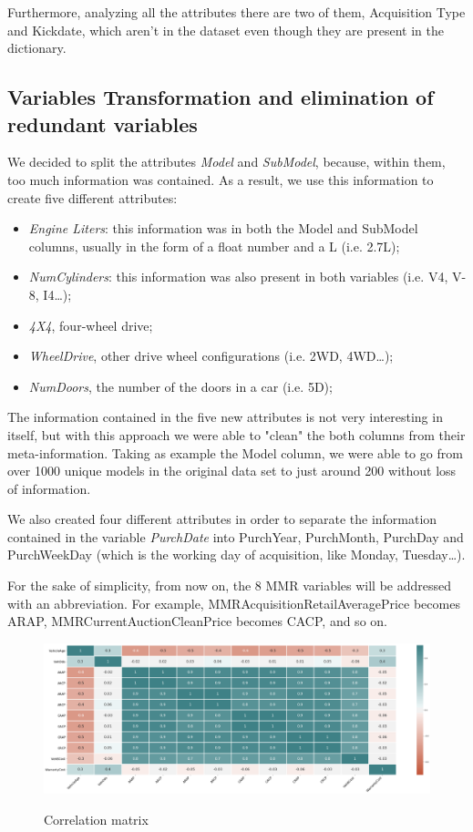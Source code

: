 \documentclass{article}
\begin{document}
	Furthermore, analyzing all the attributes there are two of them, Acquisition Type and Kickdate, which aren't in the dataset even though they are present in the dictionary.
	
	
	\subsection{Variables Transformation and elimination of redundant variables}
	
	We decided to split the attributes \emph{Model} and \emph{SubModel}, because, within them, too much information was contained. As a result, we use this information to create five different attributes:
	\begin{itemize}
		\item \emph{Engine Liters}: this information was in both the Model and SubModel columns, usually in the form of a float number and a L (i.e. 2.7L);
		\item \emph{NumCylinders}: this information was also present in both variables (i.e. V4, V-8, I4\dots);
		\item \emph{4X4}, four-wheel drive;
		\item \emph{WheelDrive}, other drive wheel configurations (i.e. 2WD, 4WD\dots); 
		\item \emph{NumDoors}, the number of the doors in a car (i.e. 5D);
	\end{itemize}
	The information contained in the five new attributes is not very interesting in itself, but with this approach we were able to "clean" the both columns from their meta-information. Taking as example the Model column, we were able to go from over 1000 unique models in the original data set to just around 200 without loss of information. 
	
	We also created four different attributes in order to separate the information contained in the variable \emph{PurchDate} into PurchYear, PurchMonth, PurchDay and PurchWeekDay (which is the working day of acquisition, like Monday, Tuesday\dots).
	
	For the sake of simplicity, from now on, the 8 MMR variables will be addressed with an abbreviation. For example, MMRAcquisitionRetailAveragePrice becomes ARAP, MMRCurrentAuctionCleanPrice becomes CACP, and so on.
	
	
	\begin{figure}[H]
		\centering
		{\includegraphics[width=\textwidth, keepaspectratio]{corr.png}}
		\caption{{ Correlation matrix }}
		\label{fig:corr}
	\end{figure}
	
\end{document}
